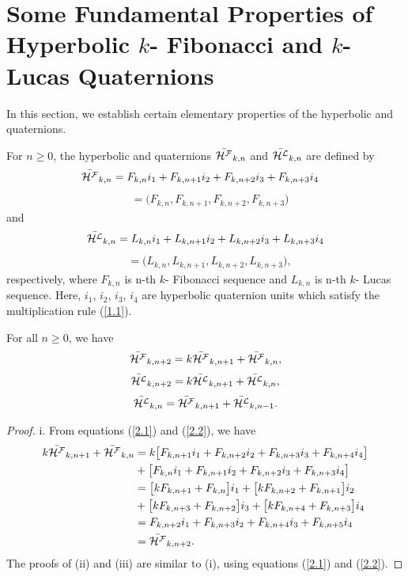  \section{Some Fundamental Properties of Hyperbolic $k$- Fibonacci and $k$- Lucas Quaternions}
In this section, we establish certain elementary  properties of the hyperbolic \kF\vspace{.5mm} and \kL\vspace{.5mm} quaternions. 
\begin{definition}\label{1}
For $n\geq{0}$, the hyperbolic \kF\vspace{.5mm} and \kL\vspace{.5mm} quaternions $\bar{{\mathcal{H^F}}}_{k,n}$ and $\bar{{\mathcal{H^L}}}_{k,n}$ are defined by 
\begin{align}\label{2.1}  
\hf_{k,n}&=F_{k,n}i_1+F_{k,n+1}i_2+F_{k,n+2}i_3+F_{k,n+3}i_4
\end{align}
\begin{align*}
&=\big(F_{k,n}, F_{k,n+1}, F_{k,n+2}, F_{k,n+3}\big)
\end{align*}
 and 
\begin{align}\label{2.2}  
\hl_{k,n}=L_{k,n}i_1+L_{k,n+1}i_2+L_{k,n+2}i_3+L_{k,n+3}i_4
\end{align}
\begin{align*}
&=\big(L_{k,n}, L_{k,n+1}, L_{k,n+2}, L_{k,n+3}\big),
\end{align*}
respectively, where $F_{k,n}$ is n-th $k$- Fibonacci sequence and $L_{k,n}$ is n-th $k$- Lucas sequence. Here, $i_1$, $i_2$, $i_3$, $i_4$ are hyperbolic quaternion units which satisfy the multiplication rule (\ref{1.1}). 
\end{definition}
\begin{theorem} For all $n\geq{0}$, we have
\begin{align} \label{2.3*}
\hf_{k,n+2}=k\hf_{k,n+1}+\hf_{k,n},
\end{align}
\begin{align}\label{2.4} 
\hl_{k,n+2}=k\hl_{k,n+1}+\hl_{k,n},
\end{align}
\begin{align}\label{2.5} 
\hl_{k,n}=\hf_{k,n+1}+\hl_{k,n-1}.
\end{align}
\end{theorem}
\begin{proof}
i. From equations (\ref{2.1}) and (\ref{2.2}), we have
\begin{align*} 
k\bar{{\mathcal{H^F}}}_{k,n+1}+\bar{{\mathcal{H^F}}}_{k,n}&=k\big[F_{k,n+1}i_1+F_{k,n+2}i_2+F_{k,n+3}i_3+F_{k,n+4}i_4\big]\\
&+\big[F_{k,n}i_1+F_{k,n+1}i_2+F_{k,n+2}i_3+F_{k,n+3}i_4\big]\\
&=\big[kF_{k,n+1}+F_{k,n}\big]i_1+\big[kF_{k,n+2}+F_{k,n+1}\big]i_2\\&+\big[kF_{k,n+3}+F_{k,n+2}\big]i_3+\big[kF_{k,n+4}+F_{k,n+3}\big]i_4\\
&=F_{k,n+2}i_1+F_{k,n+3}i_2+F_{k,n+4}i_3+F_{k,n+5}i_4\\
&=\bar{{\mathcal{H^F}}}_{k,n+2}.
\end{align*}
The proofs of (ii) and (iii) are similar to (i), using equations (\ref{2.1}) and (\ref{2.2}).
\end{proof}
